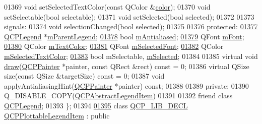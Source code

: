 \begin{DoxyCode}
01369   \textcolor{keywordtype}{void} setSelectedTextColor(\textcolor{keyword}{const} QColor &\hyperlink{a00116_ae35093fbf4f645dcefd930ca8c68b622}{color});
01370   \textcolor{keywordtype}{void} setSelectable(\textcolor{keywordtype}{bool} selectable);
01371   \textcolor{keywordtype}{void} setSelected(\textcolor{keywordtype}{bool} selected);
01372   
01373 signals:
01374   \textcolor{keywordtype}{void} selectionChanged(\textcolor{keywordtype}{bool} selected);
01375   
01376 \textcolor{keyword}{protected}:
\hypertarget{a00116_source_l01377}{}\hyperlink{a00023_aafcd9fc6fcb10f4a8d46037011afafe8}{01377}   \hyperlink{a00045}{QCPLegend} *\hyperlink{a00023_aafcd9fc6fcb10f4a8d46037011afafe8}{mParentLegend};
\hypertarget{a00116_source_l01378}{}\hyperlink{a00023_a796a604ca3309960968aec8067bfc327}{01378}   \textcolor{keywordtype}{bool} \hyperlink{a00023_a796a604ca3309960968aec8067bfc327}{mAntialiased};
\hypertarget{a00116_source_l01379}{}\hyperlink{a00023_ae916a78ac0d2a60e20a17ca2f24f9754}{01379}   QFont \hyperlink{a00023_ae916a78ac0d2a60e20a17ca2f24f9754}{mFont};
\hypertarget{a00116_source_l01380}{}\hyperlink{a00023_a974b21e9930227d281344bd2242d289d}{01380}   QColor \hyperlink{a00023_a974b21e9930227d281344bd2242d289d}{mTextColor};
\hypertarget{a00116_source_l01381}{}\hyperlink{a00023_ab971df604306b192875a7d097feb1e21}{01381}   QFont \hyperlink{a00023_ab971df604306b192875a7d097feb1e21}{mSelectedFont};
\hypertarget{a00116_source_l01382}{}\hyperlink{a00023_a4965c13854d970b24c284f0a4f005fbd}{01382}   QColor \hyperlink{a00023_a4965c13854d970b24c284f0a4f005fbd}{mSelectedTextColor};
\hypertarget{a00116_source_l01383}{}\hyperlink{a00023_ae58ebebbd0c36cc6fe897483369984d2}{01383}   \textcolor{keywordtype}{bool} mSelectable, \hyperlink{a00023_ae58ebebbd0c36cc6fe897483369984d2}{mSelected};
01384   
01385   \textcolor{keyword}{virtual} \textcolor{keywordtype}{void} \hyperlink{a00116_a2e9b3d14dffa43c79835869d488936c9}{draw}(\hyperlink{a00047}{QCPPainter} *painter, \textcolor{keyword}{const} QRect &rect) \textcolor{keyword}{const} = 0;
01386   \textcolor{keyword}{virtual} QSize size(\textcolor{keyword}{const} QSize &targetSize) \textcolor{keyword}{const} = 0;
01387   \textcolor{keywordtype}{void} applyAntialiasingHint(\hyperlink{a00047}{QCPPainter} *painter) \textcolor{keyword}{const};
01388   
01389 \textcolor{keyword}{private}:
01390   Q\_DISABLE\_COPY(\hyperlink{a00023}{QCPAbstractLegendItem})
01391   
01392   friend class \hyperlink{a00045}{QCPLegend};
01393 \};
01394 
\hypertarget{a00116_source_l01395}{}\hyperlink{a00048}{01395} class \hyperlink{a00116_a5eaab02224a642ded7fb8951e973a02c}{QCP\_LIB\_DECL} \hyperlink{a00048}{QCPPlottableLegendItem} : public 

\end{DoxyCode}
